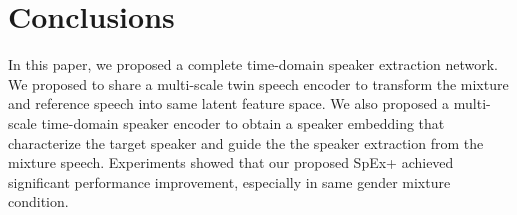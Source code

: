 \documentclass[a4paper]{article}
\begin{document}
\section{Conclusions}

In this paper, we proposed a complete time-domain speaker extraction network. We proposed to share a multi-scale twin speech encoder to transform the mixture and reference speech into same latent feature space. We also proposed a multi-scale time-domain speaker encoder to obtain a speaker embedding that characterize the target speaker and guide the the speaker extraction from the mixture speech. Experiments showed that our proposed SpEx+ achieved significant performance improvement, especially in same gender mixture condition.







\end{document}
